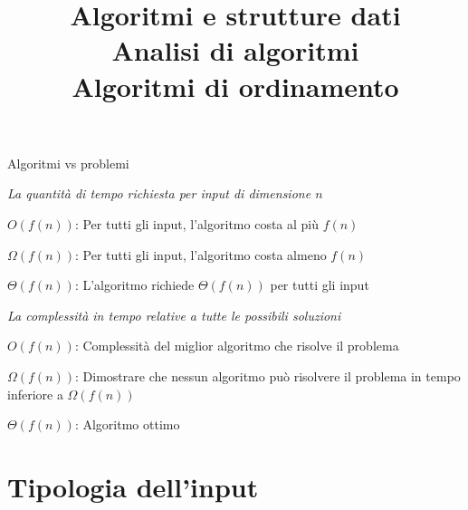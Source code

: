 \begin{frame}{Algoritmi vs problemi}

\vspace{-9pt}
\begin{myboxtitle}
{\em La quantità di tempo richiesta per input di dimensione $n$}
\BI
\item \alert{$O(f(n))$}: Per tutti gli input, l'algoritmo costa al più $f(n)$ 
\item \alert{$\Omega(f(n))$}: Per tutti gli input, l'algoritmo costa almeno $f(n)$ 
\item \alert{$\Theta(f(n))$}: L'algoritmo richiede $\Theta(f(n))$ per tutti gli input
\EI
\end{myboxtitle}

\begin{myboxtitle}
{\em La complessità in tempo relative a tutte le possibili soluzioni}
\BI
\item \alert{$O(f(n))$}: Complessità del miglior algoritmo che risolve il 
problema
\item \alert{$\Omega(f(n))$}: Dimostrare che nessun algoritmo può risolvere il problema in tempo inferiore a $\Omega(f(n))$
\item \alert{$\Theta(f(n))$}: Algoritmo ottimo
\EI
\end{myboxtitle}



\end{frame}



\title[ASD - Analisi di algoritmi]{\textbf{Algoritmi e strutture dati}\\[12pt]Analisi di algoritmi\\Algoritmi di ordinamento}

\FrameTitle

\section{Tipologia dell'input}

